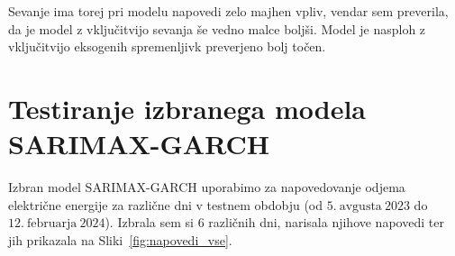 \documentclass[a4paper, 11pt]{article}
\begin{document}
\noindent Sevanje ima torej pri modelu napovedi zelo majhen vpliv, vendar sem preverila, da je model z vključitvijo sevanja
še vedno malce boljši. Model je nasploh z vključitvijo eksogenih spremenljivk preverjeno bolj točen. 



\section{Testiranje izbranega modela SARIMAX-GARCH}

Izbran model SARIMAX-GARCH uporabimo za napovedovanje odjema električne energije za različne dni v testnem obdobju
(od $5.~\text{avgusta}~2023$ do $12.~\text{februarja}~2024$). Izbrala sem si $6$ različnih dni, narisala njihove napovedi ter
jih prikazala na Sliki~\ref{fig:napovedi_vse}.
\end{document}
